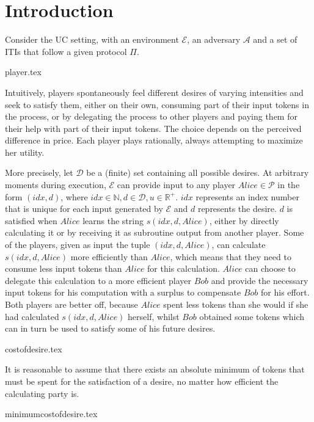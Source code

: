 \section{Introduction}
  Consider the UC setting, with an environment $\mathcal{E}$, an adversary $\mathcal{A}$ and a set of ITIs that follow a
  given protocol $\Pi$.

  {player.tex}

  Intuitively, players spontaneously feel different desires of varying intensities and seek to satisfy them, either on their
  own, consuming part of their input tokens in the process, or by delegating the process to other players and paying them for
  their help with part of their input tokens. The choice depends on the perceived difference in price. Each player plays
  rationally, always attempting to maximize her utility.
  
  More precisely, let $\mathcal{D}$ be a (finite) set containing all possible desires. At arbitrary moments during execution,
  $\mathcal{E}$ can provide input to any player $Alice \in \mathcal{P}$ in the form $\left(idx, d\right)$, where $idx \in
  \mathbb{N}, d \in \mathcal{D}, u \in \mathbb{R}^{+}$. $idx$ represents an index number that is unique for each input
  generated by $\mathcal{E}$ and $d$ represents the desire. $d$ is satisfied when $Alice$ learns the string $s\left(idx, d,
  Alice\right)$, either by directly calculating it or by receiving it as subroutine output from another player. Some of the
  players, given as input the tuple $\left(idx, d, Alice\right)$, can calculate $s\left(idx, d, Alice\right)$ more efficiently
  than $Alice$, which means that they need to consume less input tokens than $Alice$ for this calculation. $Alice$ can choose
  to delegate this calculation to a more efficient player $Bob$ and provide the necessary input tokens for his computation with
  a surplus to compensate $Bob$ for his effort. Both players are better off, because $Alice$ spent less tokens than she would
  if she had calculated $s\left(idx, d, Alice\right)$ herself, whilst $Bob$ obtained some tokens which can in turn be used to
  satisfy some of his future desires.

  {costofdesire.tex}

  It is reasonable to assume that there exists an absolute minimum of tokens that must be spent for the satisfaction of a
  desire, no matter how efficient the calculating party is.

  {minimumcostofdesire.tex}

